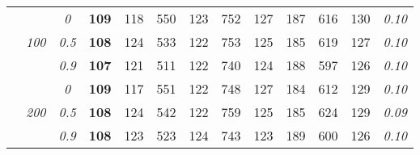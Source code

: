 \begin{table}
\begin{center}
\begin{tabular}{ccc|cc|cc|cc|cc|c|c}
\cline{2-3}\rule{0pt}{3ex}
& & \it  0  & {\bf 109} & 118 & 550 & 123 & 752 & 127 & 187 & 616 & 130 & \it  0.10 \\
 & \it  100  & \it  0.5  & {\bf 108} & 124 & 533 & 122 & 753 & 125 & 185 & 619 & 127 & \it  0.10 \\
& & \it  0.9  & {\bf 107} & 121 & 511 & 122 & 740 & 124 & 188 & 597 & 126 & \it  0.10 \\[1ex]
\cline{2-3}\rule{0pt}{3ex}
& & \it  0  & {\bf 109} & 117 & 551 & 122 & 748 & 127 & 184 & 612 & 129 & \it  0.10 \\
 & \it  200  & \it  0.5  & {\bf 108} & 124 & 542 & 122 & 759 & 125 & 185 & 624 & 129 & \it  0.09 \\
& & \it  0.9  & {\bf 108} & 123 & 523 & 124 & 743 & 123 & 189 & 600 & 126 & \it  0.10 \\
\hline\end{tabular}
\end{center}
\end{table}





